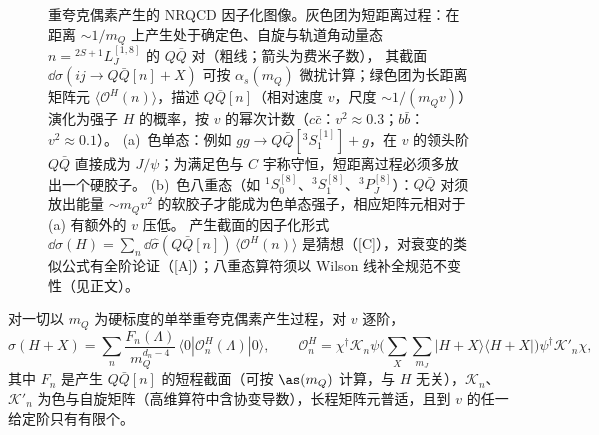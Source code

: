 \begin{figure}[htbp]
\caption{重夸克偶素产生的 NRQCD 因子化图像。灰色团为短距离过程：在距离 $\sim1/m_Q$ 上产生处于确定色、自旋与轨道角动量态 $n={}^{2S+1}L_J^{[1,8]}$ 的 $Q\bar Q$ 对（粗线；箭头为费米子数），
其截面 $\dd\hat\sigma(ij\to Q\bar Q[n]+X)$ 可按 $\alpha_s(m_Q)$ 微扰计算；绿色团为长距离矩阵元 $\langle\mathcal O^{H}(n)\rangle$，描述 $Q\bar Q[n]$（相对速度 $v$，尺度 $\sim1/(m_Qv)$）演化为强子 $H$ 的概率，按 $v$ 的幂次计数（$c\bar c$：$v^2\approx0.3$；$b\bar b$：$v^2\approx0.1$）。
(a)~色单态：例如 $gg\to Q\bar Q[{}^3S_1^{[1]}]+g$，在 $v$ 的领头阶 $Q\bar Q$ 直接成为 $J/\psi$；为满足色与 $C$ 宇称守恒，短距离过程必须多放出一个硬胶子。
(b)~色八重态（如 ${}^1S_0^{[8]}$、${}^3S_1^{[8]}$、${}^3P_J^{[8]}$）：$Q\bar Q$ 对须放出能量 $\sim m_Qv^2$ 的软胶子才能成为色单态强子，相应矩阵元相对于 (a) 有额外的 $v$ 压低。
产生截面的因子化形式 $\dd\sigma(H)=\sum_n\dd\hat\sigma(Q\bar Q[n])\,\langle\mathcal O^H(n)\rangle$ 是猜想（[C]），对衰变的类似公式有全阶论证（[A]）；八重态算符须以 Wilson 线补全规范不变性（见正文）。}
\label{fig:nrqcd}
\end{figure}
\begin{conjecture}\label{conj:heavy-nrqcd-production}
对一切以 $m_Q$ 为硬标度的单举重夸克偶素产生过程，对 $v$ 逐阶，
\begin{equation}\label{eq:heavy-nrqcd-prod}
\sigma(H+X)=\sum_n\frac{F_n(\Lambda)}{m_Q^{d_n-4}}\,\langle0|\mathcal O^H_n(\Lambda)|0\rangle,\qquad
\mathcal O^H_n=\chi^\dagger\mathcal K_n\psi\Big(\sum_X\sum_{m_J}|H+X\rangle\langle H+X|\Big)\psi^\dagger\mathcal K'_n\chi ,
\end{equation}
其中 $F_n$ 是产生 $Q\bar Q[n]$ 的短程截面（可按 $\as(m_Q)$ 计算，与 $H$ 无关），$\mathcal K_n$、$\mathcal K'_n$ 为色与自旋矩阵（高维算符中含协变导数），长程矩阵元普适，且到 $v$ 的任一给定阶只有有限个\cite[第~VI.A~节，式~(6.4)]{BodwinBraatenLepage1995}。
\end{conjecture}

